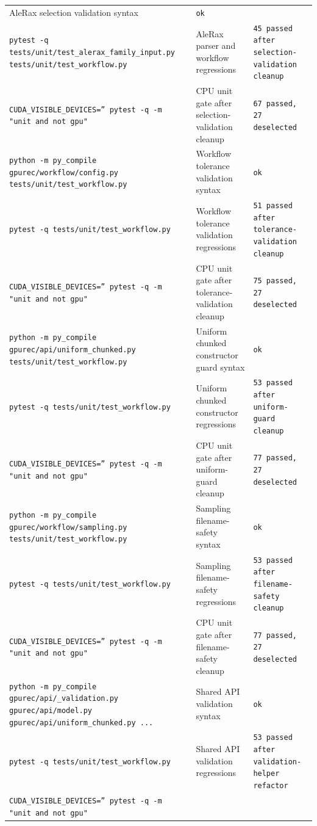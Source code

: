 \documentclass[11pt]{article}
\begin{document}
\begin{center}
\begin{tabular}{lll}
AleRax selection validation syntax &
\texttt{ok} \\
\texttt{pytest -q tests/unit/test\_alerax\_family\_input.py tests/unit/test\_workflow.py} &
AleRax parser and workflow regressions &
\texttt{45 passed after selection-validation cleanup} \\
\texttt{CUDA\_VISIBLE\_DEVICES='' pytest -q -m "unit and not gpu"} &
CPU unit gate after selection-validation cleanup &
\texttt{67 passed, 27 deselected} \\
\texttt{python -m py\_compile gpurec/workflow/config.py tests/unit/test\_workflow.py} &
Workflow tolerance validation syntax &
\texttt{ok} \\
\texttt{pytest -q tests/unit/test\_workflow.py} &
Workflow tolerance validation regressions &
\texttt{51 passed after tolerance-validation cleanup} \\
\texttt{CUDA\_VISIBLE\_DEVICES='' pytest -q -m "unit and not gpu"} &
CPU unit gate after tolerance-validation cleanup &
\texttt{75 passed, 27 deselected} \\
\texttt{python -m py\_compile gpurec/api/uniform\_chunked.py tests/unit/test\_workflow.py} &
Uniform chunked constructor guard syntax &
\texttt{ok} \\
\texttt{pytest -q tests/unit/test\_workflow.py} &
Uniform chunked constructor regressions &
\texttt{53 passed after uniform-guard cleanup} \\
\texttt{CUDA\_VISIBLE\_DEVICES='' pytest -q -m "unit and not gpu"} &
CPU unit gate after uniform-guard cleanup &
\texttt{77 passed, 27 deselected} \\
\texttt{python -m py\_compile gpurec/workflow/sampling.py tests/unit/test\_workflow.py} &
Sampling filename-safety syntax &
\texttt{ok} \\
\texttt{pytest -q tests/unit/test\_workflow.py} &
Sampling filename-safety regressions &
\texttt{53 passed after filename-safety cleanup} \\
\texttt{CUDA\_VISIBLE\_DEVICES='' pytest -q -m "unit and not gpu"} &
CPU unit gate after filename-safety cleanup &
\texttt{77 passed, 27 deselected} \\
\texttt{python -m py\_compile gpurec/api/\_validation.py gpurec/api/model.py gpurec/api/uniform\_chunked.py ...} &
Shared API validation syntax &
\texttt{ok} \\
\texttt{pytest -q tests/unit/test\_workflow.py} &
Shared API validation regressions &
\texttt{53 passed after validation-helper refactor} \\
\texttt{CUDA\_VISIBLE\_DEVICES='' pytest -q -m "unit and not gpu"} &

\end{tabular}
\end{center}
\end{document}
